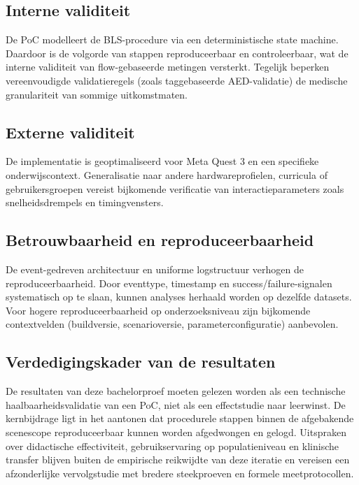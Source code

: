 \subsection{Interne validiteit}

De PoC modelleert de BLS-procedure via een deterministische state machine. Daardoor is de volgorde van stappen reproduceerbaar en controleerbaar, wat de interne validiteit van flow-gebaseerde metingen versterkt. Tegelijk beperken vereenvoudigde validatieregels (zoals taggebaseerde AED-validatie) de medische granulariteit van sommige uitkomstmaten.

\subsection{Externe validiteit}

De implementatie is geoptimaliseerd voor Meta Quest 3 en een specifieke onderwijscontext. Generalisatie naar andere hardwareprofielen, curricula of gebruikersgroepen vereist bijkomende verificatie van interactieparameters zoals snelheidsdrempels en timingvensters.

\subsection{Betrouwbaarheid en reproduceerbaarheid}

De event-gedreven architectuur en uniforme logstructuur verhogen de reproduceerbaarheid. Door eventtype, timestamp en success/failure-signalen systematisch op te slaan, kunnen analyses herhaald worden op dezelfde datasets. Voor hogere reproduceerbaarheid op onderzoeksniveau zijn bijkomende contextvelden (buildversie, scenarioversie, parameterconfiguratie) aanbevolen.

\subsection{Verdedigingskader van de resultaten}

De resultaten van deze bachelorproef moeten gelezen worden als een technische haalbaarheidsvalidatie van een PoC, niet als een effectstudie naar leerwinst. De kernbijdrage ligt in het aantonen dat procedurele stappen binnen de afgebakende scenescope reproduceerbaar kunnen worden afgedwongen en gelogd. Uitspraken over didactische effectiviteit, gebruikservaring op populatieniveau en klinische transfer blijven buiten de empirische reikwijdte van deze iteratie en vereisen een afzonderlijke vervolgstudie met bredere steekproeven en formele meetprotocollen.

